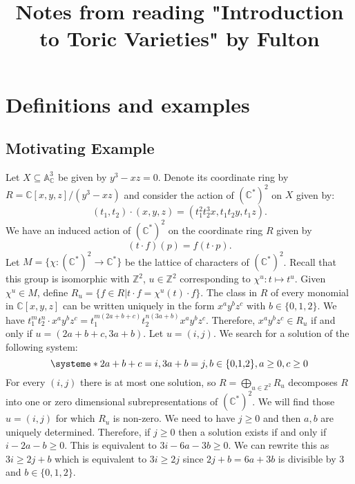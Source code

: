\documentclass[10pt,a4paper]{book}
\title{Notes from reading "Introduction to Toric Varieties" by Fulton}
\begin{document}
\maketitle
\chapter{Definitions and examples}
\section{Motivating Example}
Let $X\subseteq \mathbb{A}^3_\mathbb{C}$ be given by $y^3-xz=0$. Denote its coordinate ring by $R=\mathbb{C}[x,y,z]/(y^3-xz)$ and consider the action of $(\mathbb{C}^*)^2$ on $X$ given by:
\[
(t_1,t_2)\cdot (x,y,z) = (t_1^2t_2^3x, t_1t_2y, t_1z).
\]
We have an induced action of $(\mathbb{C}^*)^2$ on the coordinate ring $R$ given by 
\[
(t\cdot f)(p) = f(t\cdot p).
\]
Let $M =\{\chi\colon (\mathbb{C}^*)^2\to \mathbb{C}^*\}$ be the lattice of characters of $(\mathbb{C}^*)^2$. Recall that this group is isomorphic with $\mathbb{Z}^2$, $u\in \mathbb{Z}^2$ corresponding to $\chi^{u}\colon t\mapsto t^u$. Given $\chi^u\in M$, define $R_{u} = \{f\in R | t\cdot f = \chi^u(t)\cdot f\}$.
The class in $R$ of every monomial in $\mathbb{C}[x,y,z]$ can be written uniquely in the form $x^ay^bz^c$ with $b\in\{0,1,2\}$. We have $t_1^mt_2^n\cdot x^ay^bz^c = t_1^{m(2a+b+c)}t_2^{n(3a+b)}x^ay^bz^c$. Therefore, $x^ay^bz^c \in R_{u}$ if and only if $u = (2a+b+c, 3a+b)$. 
Let $u=(i,j)$. We search for a solution of the following system:
\[
\systeme*{2a+b+c = i, 3a+b = j, b\in\{\text{0,1,2}\},a\geq 0, c\geq 0}
\]
For every $(i,j)$ there is at most one solution, so $R=\bigoplus_{u\in \mathbb{Z}^2}R_u$ decomposes $R$ into one or zero dimensional subrepresentations of $(\mathbb{C}^*)^2$. We will find those $u=(i,j)$ for which $R_u$ is non-zero. We need to have $j\geq 0$ and then $a,b$ are uniquely determined. Therefore, if $j\geq 0$ then a solution exists if and only if $i-2a-b\geq 0$. This is equivalent to $3i-6a-3b\geq 0$. We can rewrite this as $3i \geq 2j+b$ which is equivalent to $3i\geq 2j$ since $2j+b = 6a+3b$ is divisible by 3 and $b\in\{0,1,2\}$. 
\end{document}
